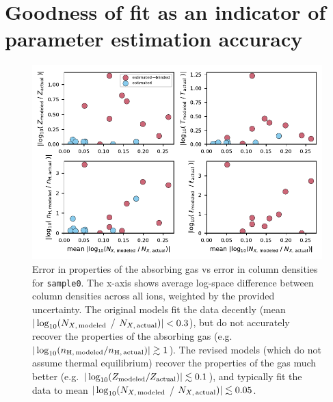 \documentclass[fleqn,usenatbib]{mnras}
\begin{document}






\appendix

\section{Goodness of fit as an indicator of parameter estimation accuracy}
\label{a: error vs error}

\begin{figure}
    \centering
    \includegraphics[width=\textwidth]{figures/sample0/error_vs_error.pdf}
    \caption{
    Error in properties of the absorbing gas vs error in column densities for \texttt{sample0}.
    The x-axis shows average log-space difference between column densities across all ions, weighted by the provided uncertainty.
    The original models fit the data decently (mean $\vert \log_{10}( N_{X,\,{\rm modeled}}$ / $N_{X,\,{\rm actual}}) \vert < 0.3$), but do not accurately recover the properties of the absorbing gas (e.g. $\vert \log_{10}( n_{\rm H,\,modeled} / n_{\rm H,\,actual}) \vert \gtrsim 1$).
    The revised models (which do not assume thermal equilibrium) recover the properties of the gas much better (e.g. $\vert \log_{10}( Z_{\rm modeled} / Z_{\rm actual}) \vert \lesssim 0.1$), and typically fit the data to mean $\vert \log_{10}( N_{X,\,{\rm modeled}}$ / $N_{X,\,{\rm actual}}) \vert \lesssim 0.05$.
    }
    \label{f: error vs error}
\end{figure}
\end{document}

